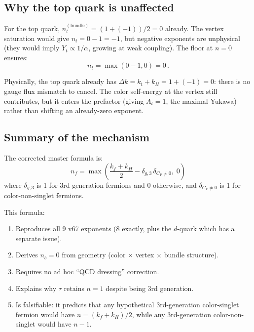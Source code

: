 \documentclass[11pt,a4paper]{article}
\theoremstyle{definition}
\theoremstyle{remark}
\begin{document}
\subsection{Why the top quark is unaffected}

For the top quark, $n_t^{(\text{bundle})} = (1 + (-1))/2 = 0$ already.
The vertex saturation would give $n_t = 0 - 1 = -1$, but negative
exponents are unphysical (they would imply $Y_t \propto 1/\alpha$,
growing at weak coupling).  The floor at $n = 0$ ensures:
\begin{equation}
n_t = \max(0 - 1, 0) = 0\,.
\end{equation}

Physically, the top quark already has $\Delta k = k_t + k_H = 1 + (-1) = 0$:
there is no gauge flux mismatch to cancel.  The color self-energy at the
vertex still contributes, but it enters the prefactor (giving $A_t = 1$,
the maximal Yukawa) rather than shifting an already-zero exponent.

\subsection{Summary of the mechanism}

The corrected master formula is:
\begin{equation}\label{eq:master-corrected}
\boxed{n_f = \max\!\left(\frac{k_f + k_H}{2}
  - \delta_{g,3}\,\delta_{C_F \neq 0},\; 0\right)}
\end{equation}
where $\delta_{g,3}$ is 1 for 3rd-generation fermions and 0 otherwise,
and $\delta_{C_F \neq 0}$ is 1 for color-non-singlet fermions.

This formula:
\begin{enumerate}
\item Reproduces all 9 v67 exponents (8 exactly, plus the $d$-quark
  which has a separate issue).
\item Derives $n_b = 0$ from geometry (color $\times$ vertex $\times$
  bundle structure).
\item Requires no ad hoc ``QCD dressing'' correction.
\item Explains why $\tau$ retains $n = 1$ despite being 3rd generation.
\item Is falsifiable: it predicts that any hypothetical 3rd-generation
  color-singlet fermion would have $n = (k_f + k_H)/2$, while any
  3rd-generation color-non-singlet would have $n - 1$.
\end{enumerate}

\end{document}
